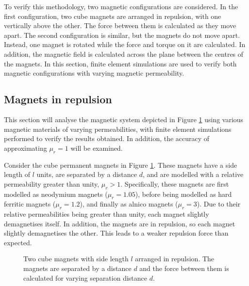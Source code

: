 To verify this methodology, two magnetic configurations are considered. In the first configuration, two cube magnets are arranged in repulsion, with one vertically above the other. The force between them is calculated as they move apart. The second configuration is similar, but the magnets do not move apart. Instead, one magnet is rotated while the force and torque on it are calculated. In addition, the magnetic field is calculated across the plane between the centres of the magnets. In this section, finite element simulations are used to verify both magnetic configurations with varying magnetic permeability.

\subsection{Magnets in repulsion}\label{sec:p4verification:magnetsRepulsion}
This section will analyse the magnetic system depicted in Figure \ref{fig:p4cubeMagnetsRepulsion} using various magnetic materials of varying permeabilities, with finite element simulations performed to verify the results obtained. In addition, the accuracy of approximating \(\mu_r = 1\) will be examined.

Consider the cube permanent magnets in Figure \ref{fig:p4cubeMagnetsRepulsion}. These magnets have a side length of \(l\) units, are separated by a distance \(d\), and are modelled with a relative permeability greater than unity, \(\mu_r > 1\). Specifically, these magnets are first modelled as neodymium magnets (\(\mu_r = 1.05\)), before being modelled as hard ferritic magnets (\(\mu_r = 1.2\)), and finally as alnico magnets (\(\mu_r = 3\)). Due to their relative permeabilities being greater than unity, each magnet slightly demagnetises itself. In addition, the magnets are in repulsion, so each magnet slightly demagnetises the other. This leads to a weaker repulsion force than expected.
\begin{figure}
	\centering
	
	\caption{Two cube magnets with side length \(l\) arranged in repulsion. The magnets are separated by a distance \(d\) and the force between them is calculated for varying separation distance \(d\).}
	\label{fig:p4cubeMagnetsRepulsion}
\end{figure}

